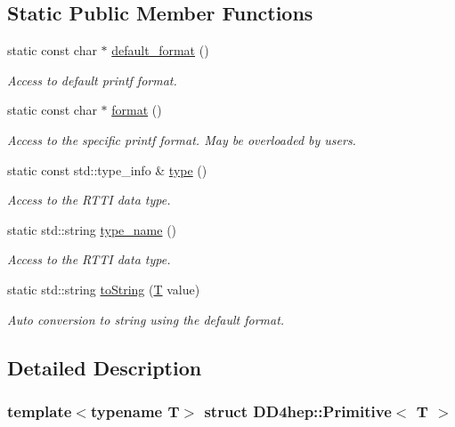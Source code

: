 \subsection*{Static Public Member Functions}
\begin{DoxyCompactItemize}
\item 
static const char $\ast$ \hyperlink{struct_d_d4hep_1_1_primitive_a27dce7707319f621a39cc7d90d55bfb0}{default\+\_\+format} ()
\begin{DoxyCompactList}\small\item\em Access to default printf format. \end{DoxyCompactList}\item 
static const char $\ast$ \hyperlink{struct_d_d4hep_1_1_primitive_ae24ddbca63bd0cac596c39c519d134f8}{format} ()
\begin{DoxyCompactList}\small\item\em Access to the specific printf format. May be overloaded by users. \end{DoxyCompactList}\item 
static const std\+::type\+\_\+info \& \hyperlink{struct_d_d4hep_1_1_primitive_afd4ccf13e6eaa9bdecdf053a0b0dee50}{type} ()
\begin{DoxyCompactList}\small\item\em Access to the R\+T\+TI data type. \end{DoxyCompactList}\item 
static std\+::string \hyperlink{struct_d_d4hep_1_1_primitive_adc0e54033e0242d525537cfa2900f3b8}{type\+\_\+name} ()
\begin{DoxyCompactList}\small\item\em Access to the R\+T\+TI data type. \end{DoxyCompactList}\item 
static std\+::string \hyperlink{struct_d_d4hep_1_1_primitive_a180947d8d7ef75a31553b3c200bbf136}{to\+String} (\hyperlink{class_t}{T} value)
\begin{DoxyCompactList}\small\item\em Auto conversion to string using the default format. \end{DoxyCompactList}\end{DoxyCompactItemize}


\subsection{Detailed Description}
\subsubsection*{template$<$typename T$>$\newline
struct D\+D4hep\+::\+Primitive$<$ T $>$}

